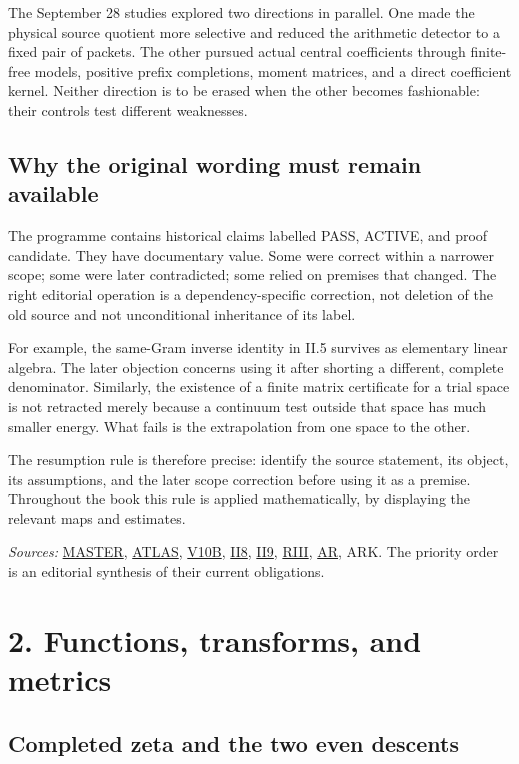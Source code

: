 \documentclass[
  10pt,
  a4paper,
  10pt,
  oneside,
  openany]{book}
\begin{document}
The September 28 studies explored two directions in parallel. One made
the physical source quotient more selective and reduced the arithmetic
detector to a fixed pair of packets. The other pursued actual central
coefficients through finite-free models, positive prefix completions,
moment matrices, and a direct coefficient kernel. Neither direction is
to be erased when the other becomes fashionable: their controls test
different weaknesses.

\subsection{Why the original wording must remain
available}\label{why-the-original-wording-must-remain-available}

The programme contains historical claims labelled PASS, ACTIVE, and
proof candidate. They have documentary value. Some were correct within a
narrower scope; some were later contradicted; some relied on premises
that changed. The right editorial operation is a dependency-specific
correction, not deletion of the old source and not unconditional
inheritance of its label.

For example, the same-Gram inverse identity in II.5 survives as
elementary linear algebra. The later objection concerns using it after
shorting a different, complete denominator. Similarly, the existence of
a finite matrix certificate for a trial space is not retracted merely
because a continuum test outside that space has much smaller energy.
What fails is the extrapolation from one space to the other.

The resumption rule is therefore precise: identify the source statement,
its object, its assumptions, and the later scope correction before using
it as a premise. Throughout the book this rule is applied
mathematically, by displaying the relevant maps and estimates.

\emph{Sources:} \hyperref[source-master]{MASTER},
\hyperref[source-atlas]{ATLAS}, \hyperref[source-v10b]{V10B},
\hyperref[source-ii8]{II8}, \hyperref[source-ii9]{II9},
\hyperref[source-riii]{RIII}, \hyperref[source-ar]{AR}, ARK. The
priority order is an editorial synthesis of their current obligations.

\section{2. Functions, transforms, and metrics}\label{ch-conventions}

\subsection{Completed zeta and the two even
descents}\label{completed-zeta-and-the-two-even-descents}
\end{document}
